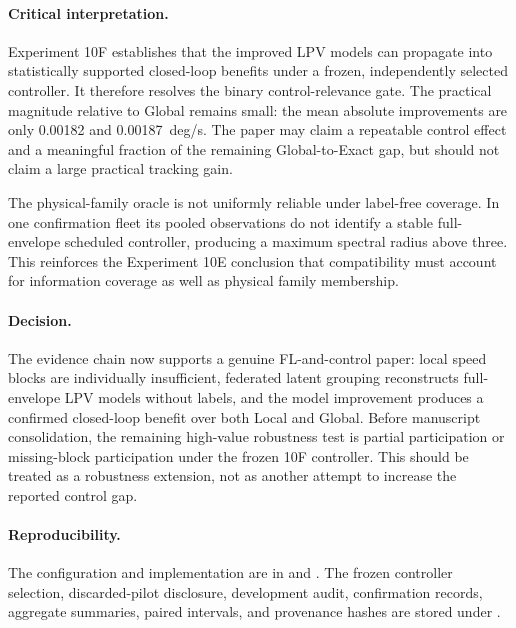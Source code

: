 \paragraph{Critical interpretation.}
Experiment 10F establishes that the improved LPV models can propagate into
statistically supported closed-loop benefits under a frozen, independently
selected controller. It therefore resolves the binary control-relevance gate.
The practical magnitude relative to Global remains small: the mean absolute
improvements are only 0.00182 and 0.00187~deg/s. The paper may claim a
repeatable control effect and a meaningful fraction of the remaining
Global-to-Exact gap, but should not claim a large practical tracking gain.

The physical-family oracle is not uniformly reliable under label-free
coverage. In one confirmation fleet its pooled observations do not identify a
stable full-envelope scheduled controller, producing a maximum spectral radius
above three. This reinforces the Experiment 10E conclusion that compatibility
must account for information coverage as well as physical family membership.

\paragraph{Decision.}
The evidence chain now supports a genuine FL-and-control paper: local speed
blocks are individually insufficient, federated latent grouping reconstructs
full-envelope LPV models without labels, and the model improvement produces a
confirmed closed-loop benefit over both Local and Global. Before manuscript
consolidation, the remaining high-value robustness test is partial
participation or missing-block participation under the frozen 10F controller.
This should be treated as a robustness extension, not as another attempt to
increase the reported control gap.

\paragraph{Reproducibility.}
The configuration and implementation are in
 and
. The frozen
controller selection, discarded-pilot disclosure, development audit,
confirmation records, aggregate summaries, paired intervals, and provenance
hashes are stored under 
.

